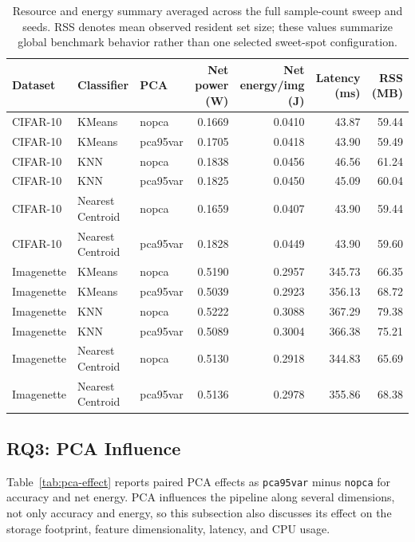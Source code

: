 \documentclass[sigconf,review]{acmart}
\begin{document}
\begin{table}[t]
  \caption{Resource and energy summary averaged across the full sample-count sweep and seeds. RSS denotes mean observed resident set size; these values summarize global benchmark behavior rather than one selected sweet-spot configuration.}
  \label{tab:resource-summary}
  \centering
  \footnotesize
  \begin{tabular}{@{}lllrrrr@{}}
    \toprule
    Dataset & Classifier & PCA & Net power (W) & Net energy/img (J) & Latency (ms) & RSS (MB) \\
    \midrule
    CIFAR-10 & KMeans & nopca & 0.1669 & 0.0410 & 43.87 & 59.44 \\
    CIFAR-10 & KMeans & pca95var & 0.1705 & 0.0418 & 43.90 & 59.49 \\
    CIFAR-10 & KNN & nopca & 0.1838 & 0.0456 & 46.56 & 61.24 \\
    CIFAR-10 & KNN & pca95var & 0.1825 & 0.0450 & 45.09 & 60.04 \\
    CIFAR-10 & Nearest Centroid & nopca & 0.1659 & 0.0407 & 43.90 & 59.44 \\
    CIFAR-10 & Nearest Centroid & pca95var & 0.1828 & 0.0449 & 43.90 & 59.60 \\
    Imagenette & KMeans & nopca & 0.5190 & 0.2957 & 345.73 & 66.35 \\
    Imagenette & KMeans & pca95var & 0.5039 & 0.2923 & 356.13 & 68.72 \\
    Imagenette & KNN & nopca & 0.5222 & 0.3088 & 367.29 & 79.38 \\
    Imagenette & KNN & pca95var & 0.5089 & 0.3004 & 366.38 & 75.21 \\
    Imagenette & Nearest Centroid & nopca & 0.5130 & 0.2918 & 344.83 & 65.69 \\
    Imagenette & Nearest Centroid & pca95var & 0.5136 & 0.2978 & 355.86 & 68.38 \\
    \bottomrule
  \end{tabular}
\end{table}

\subsection{RQ3: PCA Influence}
Table~\ref{tab:pca-effect} reports paired PCA effects as \texttt{pca95var} minus \texttt{nopca} for accuracy and net energy.
PCA influences the pipeline along several dimensions, not only accuracy and energy, so this subsection also discusses its effect on the storage footprint, feature dimensionality, latency, and CPU usage.
\end{document}
